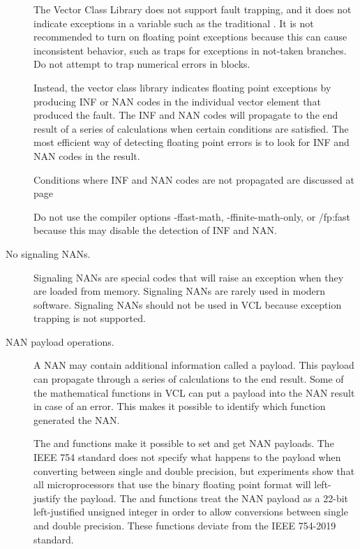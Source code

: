 \documentclass[vcl_manual.tex]{subfiles}
\begin{document}
\begin{description}
The Vector Class Library does not support fault trapping, and it does not indicate exceptions in a variable such as the traditional . It is not recommended to turn on floating point exceptions because this can cause inconsistent behavior, such as traps for exceptions in not-taken branches. Do not attempt to trap numerical errors in  blocks.

Instead, the vector class library indicates floating point exceptions by producing INF or NAN codes in the individual vector element that produced the fault.
The INF and NAN codes will propagate to the end result of a series of calculations when certain conditions are satisfied. The most efficient way of detecting floating point errors is to look for INF and NAN codes in the result.

Conditions where INF and NAN codes are not propagated are discussed at page  \pageref{FloatingPointErrors}

Do not use the compiler options -ffast-math, -ffinite-math-only, or /fp:fast because this may disable the detection of INF and NAN.

\item[No signaling NANs.]
Signaling NANs are special codes that will raise an exception when they are loaded from memory. Signaling NANs are rarely used in modern software. Signaling NANs should not be used in VCL because exception trapping is not supported.

\item[NAN payload operations.]
A NAN may contain additional information called a payload. This payload can propagate through a series of calculations to the end result. Some of the mathematical functions in VCL can put a payload into the NAN result in case of an error. This makes it possible to identify which function generated the NAN.

The  and  functions make it possible to set and get NAN payloads. The IEEE 754 standard does not specify what happens to the payload when converting between single and double precision, but experiments show that all microprocessors that use the binary floating point format will left-justify the payload. The  and  functions treat the NAN payload as a 22-bit left-justified unsigned integer in order to allow conversions between single and double precision. These functions deviate from the IEEE 754-2019 standard.


\end{description}
\end{document}
